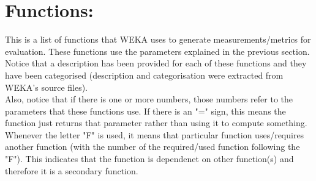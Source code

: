 \documentclass[a4paper,12pt]{article}
\begin{document}
\section{Functions:}
This is a list of functions that WEKA uses to generate measurements/metrics for evaluation. These functions use the parameters explained in the previous section.\\

Notice that a description has been provided for each of these functions and they have been categorised (description and categorisation were extracted from WEKA's source files).\\

Also, notice that if there is one or more numbers, those numbers refer to the parameters that these functions use. If there is an "=" sign, this means the function just returns that parameter rather than using it to compute something. Whenever the letter "F" is used, it means that particular function uses/requires another function (with the number of the required/used function following the "F"). This indicates that the function is dependenet on other function(s) and therefore it is a secondary function.
\end{document}
